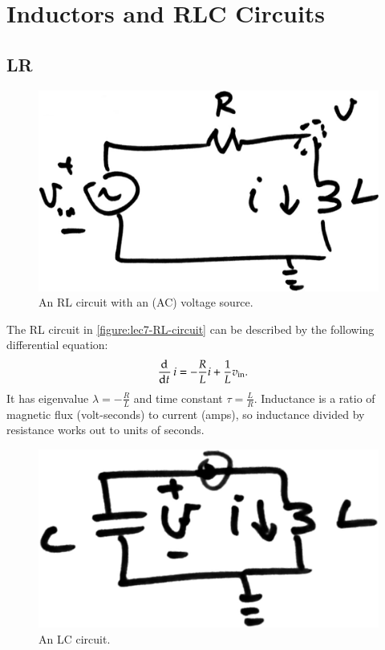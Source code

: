 \chapter{Inductors and RLC Circuits}

\section{LR}
\begin{figure}
  \centering
  \includegraphics[width=0.75\linewidth]{figures/7/RL-circuit}
  \caption{An RL circuit with an (AC) voltage source.}
  \label{figure:lec7-RL-circuit}
\end{figure}

The RL circuit in \autoref{figure:lec7-RL-circuit} can be described by the following differential equation:
\begin{align}
  \dod{}{t} i
  &= -\frac{R}{L} i + \frac{1}{L} v_\text{in}.
\end{align}
It has eigenvalue \(\lambda = -\frac{R}{L}\) and time constant \(\tau = \frac{L}{R}\).
Inductance is a ratio of magnetic flux (volt-seconds) to current (amps), so inductance divided by resistance works out to units of seconds.

\begin{figure}
  \centering
  \includegraphics[width=0.5\linewidth]{figures/7/LC-circuit}
  \caption{An LC circuit.}
  \label{figure:lec7-LC-circuit}
\end{figure}

